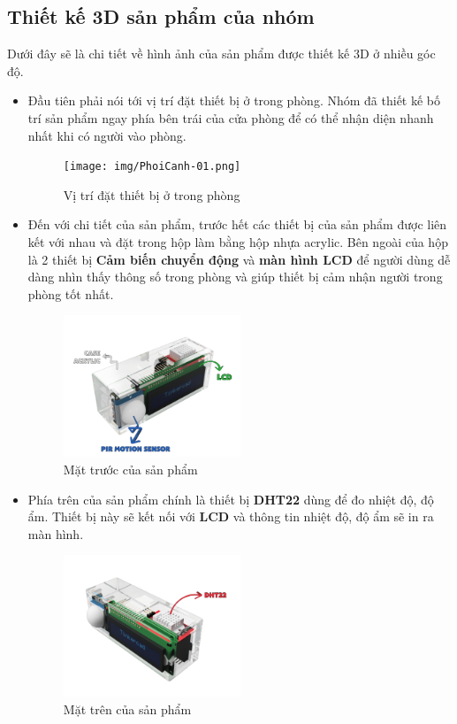 \documentclass{report}
\begin{document}
\newpage
\subsection{Thiết kế 3D sản phẩm của nhóm}
Dưới đây sẽ là chi tiết về hình ảnh của sản phẩm được thiết kế 3D ở nhiều góc độ.
\begin{itemize}
    \item Đầu tiên phải nói tới vị trí đặt thiết bị ở trong phòng. Nhóm đã thiết kế bố trí sản phẩm ngay phía bên trái của cửa phòng để có thể nhận diện nhanh nhất khi có người vào phòng.
    \begin{figure}[!h]
        \centering
        \texttt{[image: img/PhoiCanh-01.png]}
        \caption{Vị trí đặt thiết bị ở trong phòng}
    \end{figure}

    \item Đến với chi tiết của sản phẩm, trước hết các thiết bị của sản phẩm được liên kết với nhau và đặt trong hộp làm bằng hộp nhựa acrylic. Bên ngoài của hộp là 2 thiết bị \textbf{Cảm biến chuyển động} và \textbf{màn hình LCD} để người dùng dễ dàng nhìn thấy thông số trong phòng và giúp thiết bị cảm nhận người trong phòng tốt nhất.
    \begin{figure}[!ht]
        \centering
        \includegraphics[width=0.5\textwidth, keepaspectratio]{img/1-01.png}
        \caption{Mặt trước của sản phẩm}
    \end{figure}
    \pagebreak
    \item Phía trên của sản phẩm chính là thiết bị \textbf{DHT22} dùng để  đo nhiệt độ, độ ẩm. Thiết bị này sẽ kết nối với \textbf{LCD} và thông tin nhiệt độ, độ ẩm sẽ in ra màn hình.
    \begin{figure}[!ht]
        \centering
        \includegraphics[width=0.5\textwidth, keepaspectratio]{img/2-01.png}
        \caption{Mặt trên của sản phẩm}
    \end{figure}


\end{itemize}
\end{document}
